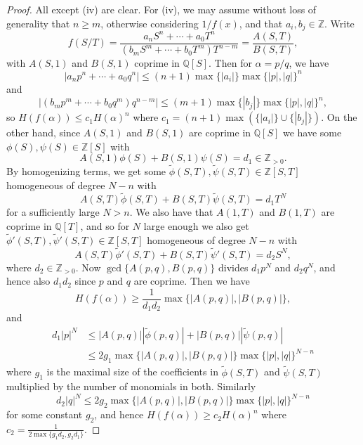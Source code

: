 \documentclass[a4paper]{article}
\theoremstyle{definition}
\newcommand{\Z}{\mathbb{Z}}
\newcommand{\Q}{\mathbb{Q}}
\begin{document}
\begin{proof}
    All except (iv) are clear. For (iv), we may assume without loss of
    generality that $n\ge m$, otherwise considering $1/f(x)$, and that
    $a_i,b_j\in\Z$. Write
    \begin{equation*}
        f(S/T)
            = \frac{a_nS^n+\cdots+a_0T^n}{(b_mS^m+\cdots+b_0T^m)T^{n-m}}
            = \frac{A(S,T)}{B(S,T)},
    \end{equation*}
    with $A(S,1)$ and $B(S,1)$ coprime in $\Q[S]$. Then for $\alpha=p/q$, we
    have
    \begin{equation*}
        |a_np^n+\cdots+a_0q^n|
            \le (n+1)\max\{|a_i|\}\max\{|p|,|q|\}^n
    \end{equation*}
    and
    \begin{equation*}
        |(b_mp^m+\cdots+b_0q^m)q^{n-m}|
            \le (m+1)\max\{|b_j|\}\max\{|p|,|q|\}^n,
    \end{equation*}
    so $H(f(\alpha))\le c_1H(\alpha)^n$ where
    $c_1=(n+1)\max(\{|a_i|\}\cup\{|b_j|\})$. On the other hand, since $A(S,1)$
    and $B(S,1)$ are coprime in $\Q[S]$ we have some $\phi(S),\psi(S)\in\Z[S]$
    with
    \begin{equation*}
        A(S,1)\phi(S)+B(S,1)\psi(S) = d_1\in\Z_{>0}.
    \end{equation*}
    By homogenizing terms, we get some
    $\tilde\phi(S,T),\tilde\psi(S,T)\in\Z[S,T]$ homogeneous of degree $N-n$ with
    \begin{equation*}
        A(S,T)\tilde\phi(S,T) + B(S,T)\tilde\psi(S,T) = d_1T^N
    \end{equation*}
    for a sufficiently large $N>n$. We also have that $A(1,T)$ and $B(1,T)$ are
    coprime in $\Q[T]$, and so for $N$ large enough we also get
    $\tilde\phi'(S,T),\tilde\psi'(S,T)\in\Z[S,T]$ homogeneous of degree $N-n$
    with
    \begin{equation*}
        A(S,T)\tilde\phi'(S,T) + B(S,T)\tilde\psi'(S,T) = d_2S^N,
    \end{equation*}
    where $d_2\in\Z_{>0}$. Now $\gcd\{A(p,q),B(p,q)\}$ divides $d_1p^N$ and
    $d_2q^N$, and hence also $d_1d_2$ since $p$ and $q$ are coprime. Then we
    have
    \begin{equation*}
        H(f(\alpha)) \ge \frac{1}{d_1d_2}\max\{|A(p,q)|,|B(p,q)|\},
    \end{equation*}
    and
    \begin{align*}
        d_1|p|^N
            &\le |A(p,q)||\tilde\phi(p,q)| + |B(p,q)||\tilde\psi(p,q)| \\
            &\le 2g_1\max\{|A(p,q)|,|B(p,q)|\}\max\{|p|,|q|\}^{N-n}
    \end{align*}
    where $g_1$ is the maximal size of the coefficients in $\tilde\phi(S,T)$ and
    $\tilde\psi(S,T)$ multiplied by the number of monomials in both. Similarly
    \begin{equation*}
        d_2|q|^N \le 2g_2\max\{|A(p,q)|,|B(p,q)|\}\max\{|p|,|q|\}^{N-n}
    \end{equation*}
    for some constant $g_2$, and hence $H(f(\alpha))\ge c_2H(\alpha)^n$ where
    $c_2=\frac{1}{2\max\{g_1d_2,g_2d_1\}}$.
\end{proof}
\end{document}
